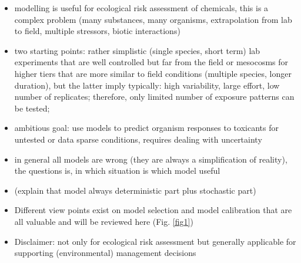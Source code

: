 \documentclass [english,11pt]{article} %
\begin{document}
\begin{itemize}
\item modelling is useful for ecological risk assessment of chemicals, this is a complex problem (many substances, many organisms, extrapolation from lab to field, multiple stressors, biotic interactions)
\item two starting points: rather simplistic (single species, short term) lab experiments that are well controlled but far from the field or mesocosms for higher tiers that are more similar to field conditions (multiple species, longer duration), but the latter imply typically: high variability, large effort, low number of replicates; therefore, only limited number of exposure patterns can be tested; 
\item ambitious goal: use models to predict organism responses to toxicants for untested or data sparse conditions, requires dealing with uncertainty 
\item in general all models are wrong (they are always a simplification of reality), the questions is, in which situation is which model useful
\item (explain that model always deterministic part plus stochastic part)
\item Different view points exist on model selection and model calibration that are all valuable and will be reviewed here (Fig. \ref{fig1}) 
\item Disclaimer: not only for ecological risk assessment but generally applicable for supporting (environmental) management decisions 
\end{itemize}



\end{document}
